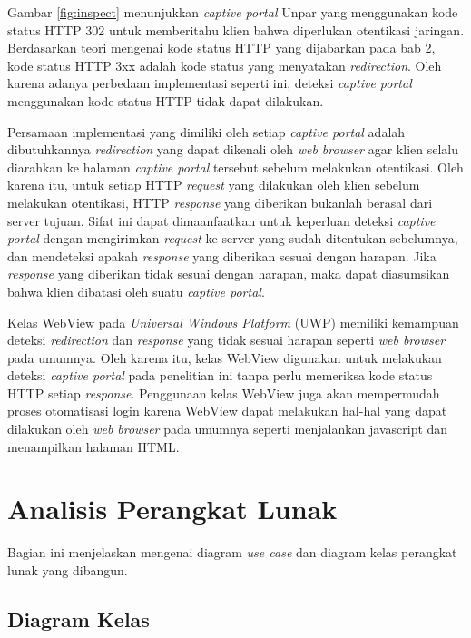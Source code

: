 Gambar \ref{fig:inspect} menunjukkan \textit{captive portal} Unpar yang menggunakan kode status HTTP 302 untuk memberitahu klien bahwa diperlukan otentikasi jaringan. Berdasarkan teori mengenai kode status HTTP yang dijabarkan pada bab 2, kode status HTTP 3xx adalah kode status yang menyatakan \textit{redirection}. Oleh karena adanya perbedaan implementasi seperti ini, deteksi \textit{captive portal} menggunakan kode status HTTP tidak dapat dilakukan.

Persamaan implementasi yang dimiliki oleh setiap \textit{captive portal} adalah dibutuhkannya \textit{redirection} yang dapat dikenali oleh \textit{web browser} agar klien selalu diarahkan ke halaman \textit{captive portal} tersebut sebelum melakukan otentikasi. Oleh karena itu, untuk setiap HTTP \textit{request} yang dilakukan oleh klien sebelum melakukan otentikasi, HTTP \textit{response} yang diberikan bukanlah berasal dari server tujuan. Sifat ini dapat dimaanfaatkan untuk keperluan deteksi \textit{captive portal} dengan mengirimkan \textit{request} ke server yang sudah ditentukan sebelumnya, dan mendeteksi apakah \textit{response} yang diberikan sesuai dengan harapan. Jika \textit{response} yang diberikan tidak sesuai dengan harapan, maka dapat diasumsikan bahwa klien dibatasi oleh suatu \textit{captive portal}.

Kelas WebView pada \textit{Universal Windows Platform} (UWP) memiliki kemampuan deteksi \textit{redirection} dan \textit{response} yang tidak sesuai harapan seperti \textit{web browser} pada umumnya. Oleh karena itu, kelas WebView digunakan untuk melakukan deteksi \textit{captive portal} pada penelitian ini tanpa perlu memeriksa kode status HTTP setiap \textit{response}. Penggunaan kelas WebView juga akan mempermudah proses otomatisasi login karena WebView dapat melakukan hal-hal yang dapat dilakukan oleh \textit{web browser} pada umumnya seperti menjalankan javascript dan menampilkan halaman HTML.



\section{Analisis Perangkat Lunak}
\label{sec:analisis_perangkat_lunak}

Bagian ini menjelaskan mengenai diagram \textit{use case} dan diagram kelas perangkat lunak yang dibangun.

\subsection{Diagram Kelas}
\label{sec:diagram_kelas}

